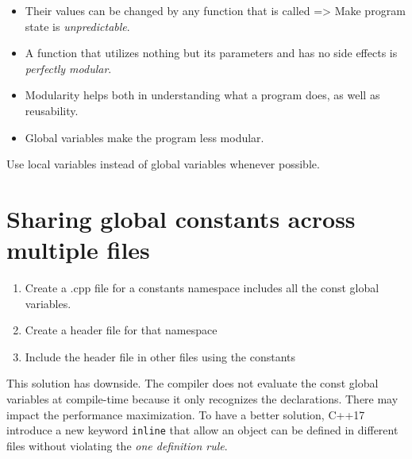 \documentclass[
  letterpaper,
  DIV=11,
  numbers=noendperiod]{scrreprt}
\providecommand{\tightlist}{%
  \setlength{\itemsep}{0pt}\setlength{\parskip}{0pt}}\usepackage{longtable,booktabs,array}
\begin{document}
\begin{itemize}
\item
  Their values can be changed by any function that is called
  =\textgreater{} Make program state is \emph{unpredictable}.
\item
  A function that utilizes nothing but its parameters and has no side
  effects is \emph{perfectly modular}.
\item
  Modularity helps both in understanding what a program does, as well as
  reusability.
\item
  Global variables make the program less modular.
\end{itemize}

\begin{tcolorbox}[enhanced jigsaw, toprule=.15mm, rightrule=.15mm, opacityback=0, breakable, leftrule=.75mm, colback=white, colframe=quarto-callout-tip-color-frame, arc=.35mm, left=2mm, bottomrule=.15mm]
\begin{minipage}[t]{5.5mm}
\textcolor{quarto-callout-tip-color}{\faLightbulb}
\end{minipage}%
\begin{minipage}[t]{\textwidth - 5.5mm}

Use local variables instead of global variables whenever possible.

\end{minipage}%
\end{tcolorbox}

\hypertarget{sec-sharConstVar}{%
\section{Sharing global constants across multiple
files}\label{sec-sharConstVar}}

\begin{enumerate}
\def\labelenumi{\arabic{enumi}.}
\tightlist
\item
  Create a .cpp file for a constants namespace includes all the const
  global variables.
\item
  Create a header file for that namespace
\item
  Include the header file in other files using the constants
\end{enumerate}

This solution has downside. The compiler does not evaluate the const
global variables at compile-time because it only recognizes the
declarations. There may impact the performance maximization. To have a
better solution, C++17 introduce a new keyword \texttt{inline} that
allow an object can be defined in different files without violating the
\emph{one definition rule}.
\end{document}
